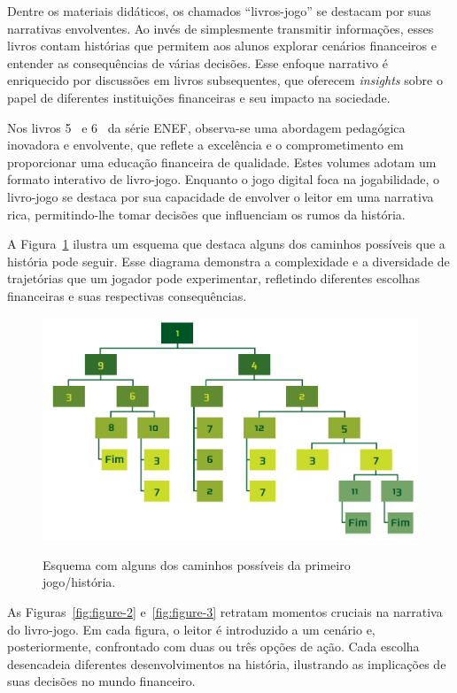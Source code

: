 Dentre os materiais didáticos, os chamados ``livros-jogo'' se destacam por suas narrativas envolventes. Ao invés de simplesmente transmitir informações, esses livros contam histórias que permitem aos alunos explorar cenários financeiros e entender as consequências de várias decisões. Esse enfoque narrativo é enriquecido por discussões em livros subsequentes, que oferecem \textit{insights} sobre o papel de diferentes instituições financeiras e seu impacto na sociedade.

Nos livros 5~\cite{Livro_ENEF_5_Ano} e 6~\cite{Livro_ENEF_6_Ano} da série ENEF, observa-se uma abordagem pedagógica inovadora e envolvente, que reflete a excelência e o comprometimento em proporcionar uma educação financeira de qualidade. Estes volumes adotam um formato interativo de livro-jogo. Enquanto o jogo digital foca na jogabilidade, o livro-jogo se destaca por sua capacidade de envolver o leitor em uma narrativa rica, permitindo-lhe tomar decisões que influenciam os rumos da história.

A Figura~\ref{fig:figure-1} ilustra um esquema que destaca alguns dos caminhos possíveis que a história pode seguir. Esse diagrama demonstra a complexidade e a diversidade de trajetórias que um jogador pode experimentar, refletindo diferentes escolhas financeiras e suas respectivas consequências.

\begin{figure}[ht]
	\centering
	\caption{Esquema com alguns dos caminhos possíveis da primeiro jogo/história.}
	\includegraphics[scale=0.3]{Textuais/Pictures/Picture1.png}
	\label{fig:figure-1}
\end{figure}

As Figuras~\ref{fig:figure-2} e~\ref{fig:figure-3} retratam momentos cruciais na narrativa do livro-jogo. Em cada figura, o leitor é introduzido a um cenário e, posteriormente, confrontado com duas ou três opções de ação. Cada escolha desencadeia diferentes desenvolvimentos na história, ilustrando as implicações de suas decisões no mundo financeiro.

